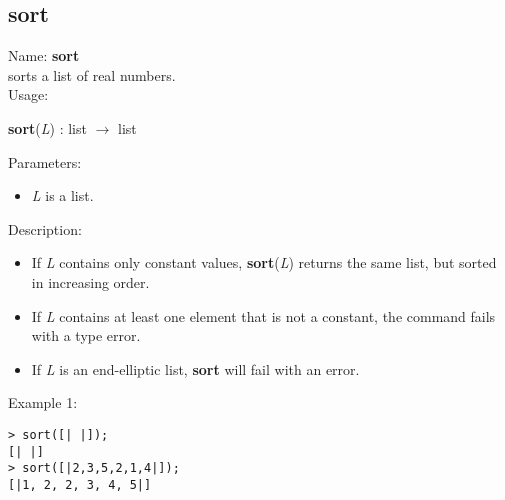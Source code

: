\subsection{sort}
\label{labsort}
\noindent Name: \textbf{sort}\\
sorts a list of real numbers.\\
\noindent Usage: 
\begin{center}
\textbf{sort}(\emph{L}) : \textsf{list} $\rightarrow$ \textsf{list}\\
\end{center}
Parameters: 
\begin{itemize}
\item \emph{L} is a list.
\end{itemize}
\noindent Description: \begin{itemize}

\item If \emph{L} contains only constant values, \textbf{sort}(\emph{L}) returns the same list, but
   sorted in increasing order.

\item If \emph{L} contains at least one element that is not a constant, the command fails 
   with a type error.

\item If \emph{L} is an end-elliptic list, \textbf{sort} will fail with an error.
\end{itemize}
\noindent Example 1: 
\begin{center}\begin{minipage}{15cm}\begin{Verbatim}[frame=single]
> sort([| |]);
[| |]
> sort([|2,3,5,2,1,4|]);
[|1, 2, 2, 3, 4, 5|]
\end{Verbatim}
\end{minipage}\end{center}
